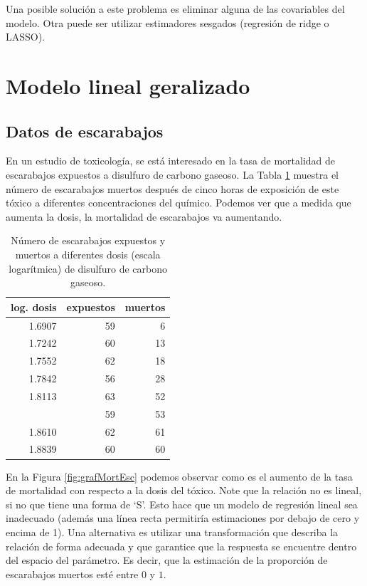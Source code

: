 \documentclass[
]{article}
\begin{document}
Una posible solución a este problema es eliminar alguna de las covariables del modelo. Otra puede ser utilizar estimadores sesgados (regresión de ridge o LASSO).

\section{Modelo lineal geralizado}\label{modelo-lineal-geralizado}

\subsection*{Datos de escarabajos}\label{datos-de-escarabajos}

En un estudio de toxicología, se está interesado en la tasa de mortalidad de escarabajos expuestos a disulfuro de carbono gaseoso. La Tabla \ref{tab:TmortEsc} muestra el número de escarabajos muertos después de cinco horas de exposición de este tóxico a diferentes concentraciones del químico. Podemos ver que a medida que aumenta la dosis, la mortalidad de escarabajos va aumentando.

\begin{table}

\caption{\label{tab:TmortEsc}Número de escarabajos expuestos y muertos a diferentes dosis (escala logarítmica) de disulfuro de carbono gaseoso.}
\centering
\begin{tabular}[t]{rrr}
\toprule
log. dosis & expuestos & muertos\\
\midrule
1.6907 & 59 & 6\\
1.7242 & 60 & 13\\
1.7552 & 62 & 18\\
1.7842 & 56 & 28\\
1.8113 & 63 & 52\\
\addlinespace
1.8369 & 59 & 53\\
1.8610 & 62 & 61\\
1.8839 & 60 & 60\\
\bottomrule
\end{tabular}
\end{table}

En la Figura \ref{fig:grafMortEsc} podemos observar como es el aumento de la tasa de mortalidad con respecto a la dosis del tóxico. Note que la relación no es lineal, si no que tiene una forma de `S'. Esto hace que un modelo de regresión lineal sea inadecuado (además una línea recta permitiría estimaciones por debajo de cero y encima de 1). Una alternativa es utilizar una transformación que describa la relación de forma adecuada y que garantice que la respuesta se encuentre dentro del espacio del parámetro. Es decir, que la estimación de la proporción de escarabajos muertos esté entre \(0\) y \(1\).
\end{document}
